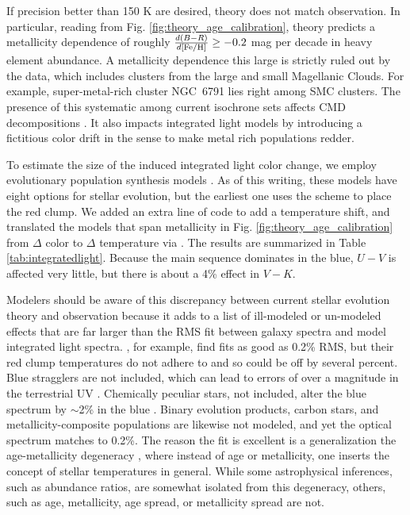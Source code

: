 \documentclass[twocolumn,times]{aastex631}
\begin{document}
If precision better than 150 K are desired, theory does not match observation. In particular, reading from Fig. \ref{fig:theory_age_calibration}, theory predicts a metallicity dependence of roughly $\frac{d(B-R)}{d{\rm [Fe/H]}} \geq -0.2$ mag per decade in heavy element abundance. A metallicity dependence this large is strictly ruled out by the data, which includes clusters from the large and small Magellanic Clouds. For example, super-metal-rich cluster NGC~6791 lies right among SMC clusters. The presence of this systematic among current isochrone sets affects CMD decompositions \citep{2001ApJS..136...25H,2002MNRAS.332...91D}. It also impacts integrated light models by introducing a fictitious color drift in the sense to make metal rich populations redder.

To estimate the size of the induced integrated light color change, we employ evolutionary population synthesis models \citep{2022MNRAS.511.3198W}. As of this writing, these models have eight options for stellar evolution, but the earliest one \citep{1994ApJS...95..107W} uses the  scheme to place the red clump. We added an extra line of code to add a temperature shift, and translated the models that span metallicity in Fig. \ref{fig:theory_age_calibration} from $\Delta$ color to $\Delta$ temperature via \cite{2011ApJS..193....1W}. The results are summarized in Table \ref{tab:integratedlight}. Because the main sequence dominates in the blue, $U-V$ is affected very little, but there is about a 4\% effect in $V-K$. 

Modelers should be aware of this discrepancy between current stellar evolution theory and observation because it adds to a list of ill-modeled or un-modeled effects that are far larger than the RMS fit between galaxy spectra and model integrated light spectra. \cite{2014ApJ...780...33C}, for example, find fits as good as 0.2\% RMS, but their red clump temperatures do not adhere to  and so could be off by several percent. Blue stragglers are not included, which can lead to errors of over a magnitude in the terrestrial UV \citep{1999ApJ...524..824D}. Chemically peculiar stars, not included, alter the blue spectrum by $\sim$2\% in the blue \citep{2023MNRAS.518.4106W}. Binary evolution products, carbon stars, and metallicity-composite populations are likewise not modeled, and yet the optical spectrum matches to 0.2\%. The reason the fit is excellent is a generalization the age-metallicity degeneracy \citep{1994ApJS...95..107W}, where instead of age or metallicity, one inserts the concept of stellar temperatures in general. While some astrophysical inferences, such as abundance ratios, are somewhat isolated from this degeneracy, others, such as age, metallicity, age spread, or metallicity spread are not.
\end{document}
